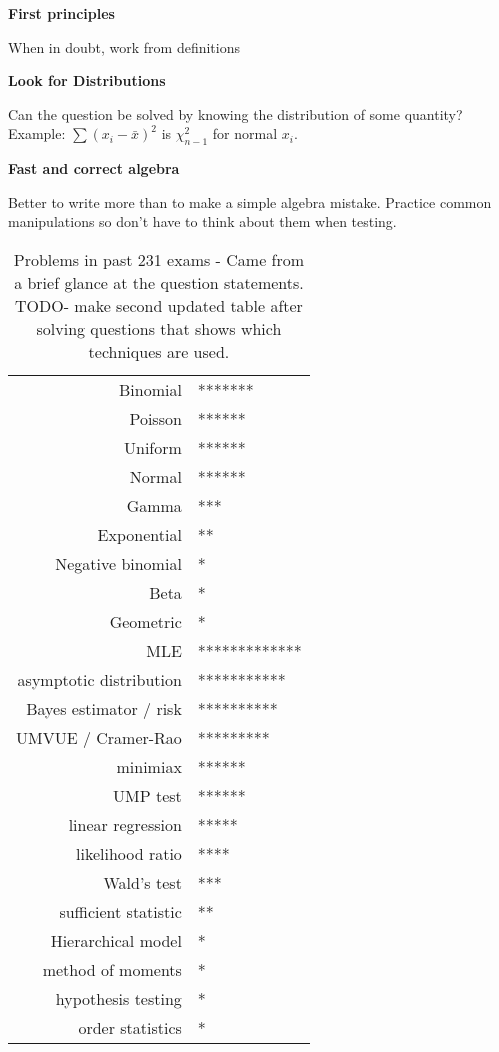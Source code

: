 \documentclass[10pt, twocolumn]{article}
\begin{document}
\textbf{First principles}

When in doubt, work from definitions

\textbf{Look for Distributions} 

Can the question be solved by knowing the distribution of some
quantity?  Example: $\sum (x_i - \bar{x})^2$ is $\chi^2_{n-1}$ for
normal $x_i$.

\textbf{Fast and correct algebra}

Better to write more than to make a simple algebra mistake.
Practice common manipulations so don't have to think about them
when testing.

\begin{table}[]
    \centering
    \caption{Problems in past 231 exams - Came from a brief glance at the
    question statements. TODO- make second updated table after solving
    questions that shows which techniques are used.}
    \label{231problems}
    \begin{tabular}{rl}

        Binomial                & ******* \\
        Poisson                 & ****** \\
        Uniform                 & ****** \\
        Normal                  & ****** \\
        Gamma                   & *** \\
        Exponential             & ** \\
        Negative binomial       & * \\
        Beta                    & * \\
        Geometric               & * \\
        MLE                     & ************* \\
        asymptotic distribution & *********** \\
        Bayes estimator / risk  & ********** \\
        UMVUE / Cramer-Rao      & ********* \\
        minimiax                & ****** \\
        UMP test                & ****** \\
        linear regression       & ***** \\
        likelihood ratio        & **** \\
        Wald's test             & *** \\
        sufficient statistic    & ** \\
        Hierarchical model      & * \\
        method of moments       & * \\
        hypothesis testing      & * \\
        order statistics        & * \\

    \end{tabular}
\end{table}
\end{document}
